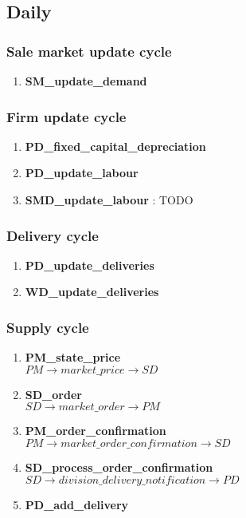 \documentclass[11pt]{article}
\begin{document}
\subsection{Daily}

\subsubsection{Sale market update cycle}
\begin{enumerate}
	\item \textbf{SM\_update\_demand}
\end{enumerate}

\subsubsection{Firm update cycle}
\begin{enumerate}
	\item \textbf{PD\_fixed\_capital\_depreciation}
	\item \textbf{PD\_update\_labour}
	\item \textbf{SMD\_update\_labour} : TODO
\end{enumerate}

\subsubsection{Delivery cycle}
\begin{enumerate}
	\item \textbf{PD\_update\_deliveries}
	\item \textbf{WD\_update\_deliveries}
\end{enumerate}

\subsubsection{Supply cycle}
\begin{enumerate}
	\item \textbf{PM\_state\_price} \\
	$ PM \rightarrow market\_price \rightarrow SD $
	\item \textbf{SD\_order} \\
	$ SD \rightarrow market\_order \rightarrow PM $
	\item \textbf{PM\_order\_confirmation} \\
	$ PM \rightarrow market\_order\_confirmation \rightarrow SD $
	\item \textbf{SD\_process\_order\_confirmation} \\
	$ SD \rightarrow division\_delivery\_notification \rightarrow PD $
	\item \textbf{PD\_add\_delivery}
		
\end{enumerate}
\end{document}
